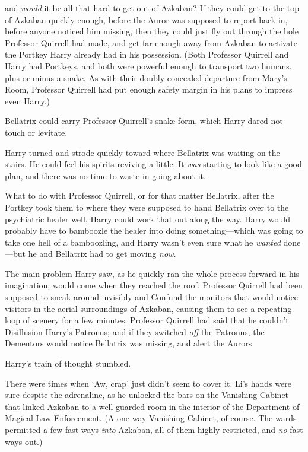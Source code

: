 {\el} and \emph{would} it be all that hard to get out of Azkaban? If they
could get to the top of Azkaban quickly enough, before the Auror was supposed
to report back in, before anyone noticed him missing, then they could just fly
out through the hole Professor Quirrell had made, and get far enough away from
Azkaban to activate the Portkey Harry already had in his possession. (Both
Professor Quirrell and Harry had Portkeys, and both were powerful enough to
transport two humans, plus or minus a snake. As with their doubly-concealed
departure from Mary's Room, Professor Quirrell had put enough safety margin in
his plans to impress even Harry.)

Bellatrix could carry Professor Quirrell's snake form, which Harry dared not
touch or levitate.

Harry turned and strode quickly toward where Bellatrix was waiting on the
stairs. He could feel his spirits reviving a little. It \emph{was} starting to
look like a good plan, and there was no time to waste in going about it.

What to do with Professor Quirrell, or for that matter Bellatrix, after the
Portkey took them to where they were supposed to hand Bellatrix over to the
psychiatric healer{\el} well, Harry could work that out along the way. Harry
would probably have to bamboozle the healer into doing something---which was
going to take one hell of a bamboozling, and Harry wasn't even sure what he
\emph{wanted} done---but he and Bellatrix had to get moving \emph{now.}

The main problem Harry saw, as he quickly ran the whole process forward in his
imagination, would come when they reached the roof. Professor Quirrell had been
supposed to sneak around invisibly and Confund the monitors that would notice
visitors in the aerial surroundings of Azkaban, causing them to see a repeating
loop of scenery for a few minutes. Professor Quirrell had said that he couldn't
Disillusion Harry's Patronus; and if they switched \emph{off} the Patronus, the
Dementors would notice Bellatrix was missing, and alert the Aurors{\el}

Harry's train of thought stumbled.

There were times when `Aw, crap' just didn't seem to cover it.
\sbreak
Li's hands were sure despite the adrenaline, as he unlocked the bars on the
Vanishing Cabinet that linked Azkaban to a well-guarded room in the interior of
the Department of Magical Law Enforcement. (A one-way Vanishing Cabinet, of
course. The wards permitted a few fast ways \emph{into} Azkaban, all of them
highly restricted, and \emph{no} fast ways out.)

